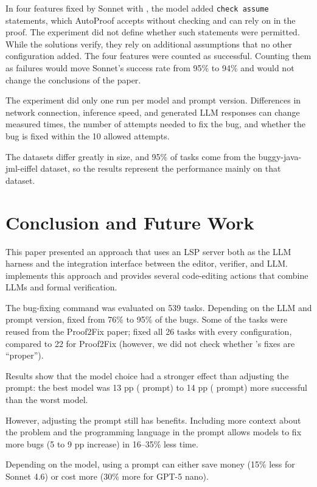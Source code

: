 \documentclass[runningheads]{llncs}
\begin{document}
In four features fixed by Sonnet with \rich{}, the model added \lstinline|check assume| statements,
which AutoProof accepts without checking and can rely on in the proof.
The experiment did not define whether such statements were permitted.
While the solutions verify, they rely on additional assumptions that
no other configuration added. The four features were counted as
successful. Counting them as failures would move Sonnet's \rich{} success rate from
95\% to 94\% and would not change the conclusions of the paper.

The experiment did only one run per model and prompt version.
Differences in
network connection, inference speed, and generated LLM responses can change
measured times, the number of attempts needed to fix the bug, and whether
the bug is fixed within the 10 allowed attempts.

The datasets differ greatly in size, and 95\% of tasks come from the buggy-java-jml-eiffel dataset,
so the results represent the performance mainly on that dataset.

\section{Conclusion and Future Work}\label{future-work}
This paper presented an approach that uses an LSP server both as the
LLM harness and the integration interface between the editor, verifier,
and LLM. \toolname{} implements this approach and provides several code-editing actions
that combine LLMs and formal verification.

The bug-fixing command was evaluated on 539 tasks. Depending on the LLM and
prompt version, \toolname{} fixed from 76\% to 95\% of the bugs.
Some of the tasks were reused from the Proof2Fix paper; \toolname{}
fixed all 26 tasks with every configuration,
compared to 22 for Proof2Fix (however, we did not check whether \toolname{}'s fixes
are ``proper'').

Results show that the model choice had a stronger effect than adjusting the prompt:
the best model was 13 pp (\rich{} prompt) to 14 pp (\bare{} prompt) more successful than the worst model.

However, adjusting the prompt still has benefits. Including more context
about the problem and the programming language in the prompt allows models
to fix more bugs (5 to 9 pp increase) in 16--35\% less time.

Depending on the model, using a \bare{} prompt can either save money (15\% less for Sonnet 4.6)
or cost more (30\% more for GPT-5 nano).
\end{document}
